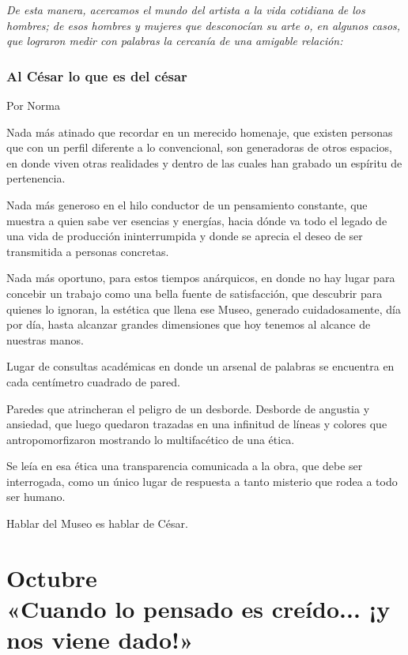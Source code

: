 \documentclass[11pt,twoside,openright,a5paper]{book}
\begin{document}
\vspace{0.5cm}
\emph{De esta manera, acercamos el mundo del artista a la vida cotidiana de los hombres; de esos hombres y mujeres que desconocían su arte o, en algunos casos, que lograron medir con palabras la cercanía de una amigable relación:}

\section*{Al César lo que es del césar}

                                                                              \begin{flushright}Por Norma\end{flushright}

Nada más atinado que recordar en un merecido homenaje, que existen personas que con un perfil diferente a lo convencional, son generadoras de otros espacios, en donde viven otras realidades  y dentro de las cuales han grabado un espíritu de pertenencia.

Nada más generoso en el hilo conductor de un pensamiento constante, que muestra a quien sabe ver esencias y energías, hacia dónde va todo el legado de una vida de producción ininterrumpida y donde se aprecia el deseo de ser transmitida a personas concretas.

Nada más oportuno, para estos tiempos anárquicos, en donde no hay lugar para concebir un trabajo como una bella fuente de satisfacción, que descubrir para quienes lo ignoran, la estética que llena ese Museo, generado cuidadosamente, día por día, hasta alcanzar grandes dimensiones que hoy tenemos al alcance de nuestras manos.

Lugar de consultas académicas en donde un arsenal de palabras se encuentra en cada centímetro cuadrado de pared.

Paredes que atrincheran el peligro de un desborde. Desborde de angustia y ansiedad, que luego quedaron trazadas en una infinitud de líneas y colores que antropomorfizaron mostrando lo multifacético de una ética.

Se leía en esa ética una transparencia comunicada a la obra, que debe ser interrogada, como un único lugar de respuesta a tanto misterio que rodea a todo ser humano.

Hablar del Museo es hablar de César.

\part*{Octubre\\«Cuando lo pensado es creído... ¡y nos viene dado!»}
\end{document}
